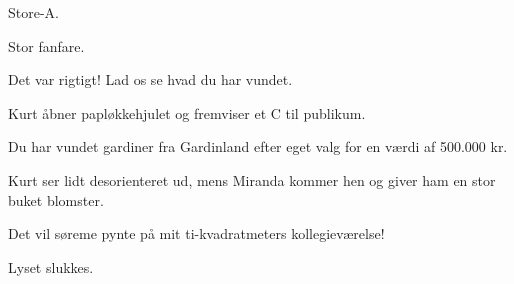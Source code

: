 \documentclass[a4paper,11pt]{article}
\begin{document}
\begin{sketch}
        Store-A.

Stor fanfare.

      Det var rigtigt! Lad os se hvad du har vundet.

\scene Kurt åbner papløkkehjulet og fremviser et C til publikum.

      Du har vundet gardiner fra Gardinland efter eget
             valg for en værdi af 500.000 kr.

\scene Kurt ser lidt desorienteret ud, mens Miranda kommer hen og giver
ham en stor buket blomster.

 Det vil søreme pynte på mit ti-kvadratmeters
kollegieværelse!

\scene Lyset slukkes.

\end{sketch}
\end{document}
